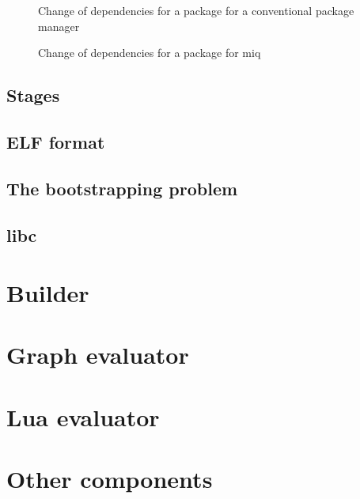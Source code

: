 \begin{figure}[hbtp]
    \centerfloat
    
    \caption{Change of dependencies for a package for a conventional package manager}
    \label{fig:depswap}
\end{figure}

\begin{figure}[hbtp]
    \centerfloat
    
    \caption{Change of dependencies for a package for miq}
    \label{fig:depswap_miq}
\end{figure}




\subsection{Stages}



\subsection{ELF format}

\subsection{The bootstrapping problem}

\subsection{libc}

\section{Builder}

\section{Graph evaluator}

\section{Lua evaluator}

\section{Other components}

